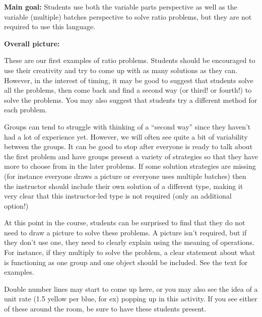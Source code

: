 \documentclass[nooutcomes,noauthor,handout]{ximera}
\begin{document}
\begin{instructorNotes}

{\bf Main goal:} Students use both the variable parts perspective as well as the variable (multiple) batches perspective to solve ratio problems, but they are not required to use this language.

{\bf Overall picture:}

These are our first examples of ratio problems. Students should be encouraged to use their creativity and try to come up with as many solutions as they can. However, in the interest of timing, it may be good to suggest that students solve all the problems, then come back and find a second way (or third! or fourth!) to solve the problems. You may also suggest that students try a different method for each problem.

Groups can tend to struggle with thinking of a ``second way'' since they haven't had a lot of experience yet. However, we will often see quite a bit of variability between the groups. It can be good to stop after everyone is ready to talk about the first problem and have groups present a variety of strategies so that they have more to choose from in the later problems. If some solution strategies are missing (for instance everyone draws a picture or everyone uses multiple batches) then the instructor should include their own solution of a different type, making it very clear that this instructor-led type is not required (only an additional option!)

At this point in the course, students can be surprised to find that they do not need to draw a picture to solve these problems. A picture isn't required, but if they don't use one, they need to clearly explain using the meaning of operations. For instance, if they multiply to solve the problem, a clear statement about what is functioning as one group and one object should be included. See the text for examples.

Double number lines may start to come up here, or you may also see the idea of a unit rate (1.5 yellow per blue, for ex) popping up in this activity.  If you see either of these around the room, be sure to have these students present.

%


\end{instructorNotes}
\end{document}
